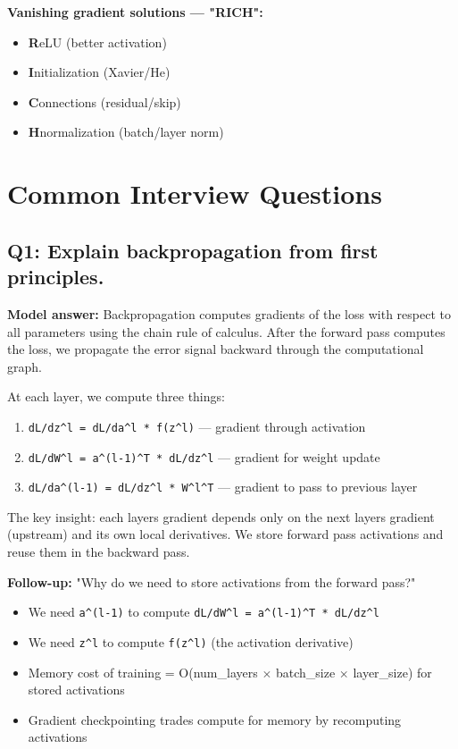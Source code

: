 \documentclass[11pt]{article}
\providecommand{\tightlist}{\setlength{\itemsep}{1pt}\setlength{\parskip}{0pt}}
\begin{document}
\textbf{Vanishing gradient solutions --- "RICH":}

\begin{itemize}
\tightlist
\item
  \textbf{R}eLU (better activation)
\item
  \textbf{I}nitialization (Xavier/He)
\item
  \textbf{C}onnections (residual/skip)
\item
  \textbf{H}normalization (batch/layer norm)
\end{itemize}

\section{Common Interview Questions}\label{common-interview-questions}

\subsection{Q1: Explain backpropagation from first principles.}\label{q1-explain-backpropagation-from-first-principles}

\textbf{Model answer:}
Backpropagation computes gradients of the loss with respect to all parameters using the chain rule of calculus. After the forward pass computes the loss, we propagate the error signal backward through the computational graph.

At each layer, we compute three things:

\begin{enumerate}
\def\labelenumi{\arabic{enumi}.}
\tightlist
\item
  \texttt{dL/dz\^{}l\ =\ dL/da\^{}l\ *\ f\textquotesingle{}(z\^{}l)} --- gradient through activation
\item
  \texttt{dL/dW\^{}l\ =\ a\^{}(l-1)\^{}T\ *\ dL/dz\^{}l} --- gradient for weight update
\item
  \texttt{dL/da\^{}(l-1)\ =\ dL/dz\^{}l\ *\ W\^{}l\^{}T} --- gradient to pass to previous layer
\end{enumerate}

The key insight: each layer\textquotesingle s gradient depends only on the next layer\textquotesingle s gradient (upstream) and its own local derivatives. We store forward pass activations and reuse them in the backward pass.

\textbf{Follow-up:} "Why do we need to store activations from the forward pass?"

\begin{itemize}
\tightlist
\item
  We need \texttt{a\^{}(l-1)} to compute \texttt{dL/dW\^{}l\ =\ a\^{}(l-1)\^{}T\ *\ dL/dz\^{}l}
\item
  We need \texttt{z\^{}l} to compute \texttt{f\textquotesingle{}(z\^{}l)} (the activation derivative)
\item
  Memory cost of training = O(num\_layers \(\times\) batch\_size \(\times\) layer\_size) for stored activations
\item
  Gradient checkpointing trades compute for memory by recomputing activations
\end{itemize}
\end{document}
